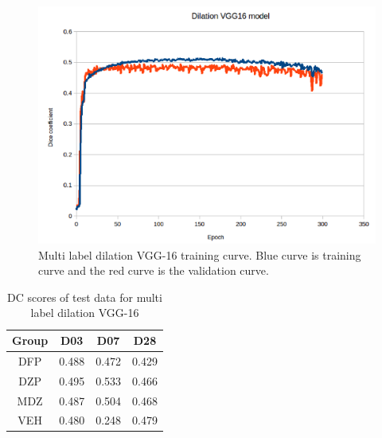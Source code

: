 \begin{figure}[!tbh]
\centering
\includegraphics[width=\textwidth]{results/train_results_multi_dilation.png}
\caption{Multi label dilation VGG-16 training curve. Blue curve is training curve and the red curve is the validation curve. }
\label{fig:results_multi_dilation_train}
\end{figure}

\begin{table}[tbh]
\renewcommand{\arraystretch}{1}
\centering
\begin{tabular}{|c|c|c|c|}
\hline
\textbf{Group} & \textbf{D03}& \textbf{D07}& \textbf{D28}\\
\hline
DFP & 0.488 & 0.472 & 0.429\\      
\hline
DZP & 0.495 & 0.533 & 0.466\\
\hline
MDZ & 0.487 & 0.504 & 0.468\\ 
\hline
VEH & 0.480 & 0.248 & 0.479\\ 
\hline
\end{tabular}
\caption{DC scores of test data for multi label dilation VGG-16}
\label{tab.multi_model_results_dilation}
\end{table}


